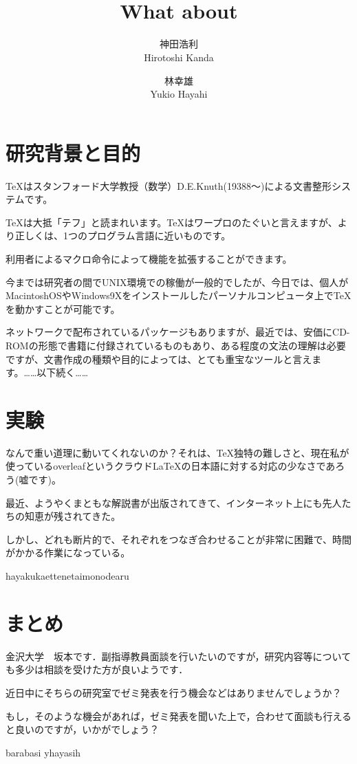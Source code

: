 \documentclass[twocolumn,a4paper]{jarticle}
\title{{\bf電子情報通信学会題目}
{\normalsize \\ What about}}
\author{
神田浩利 \\ Hirotoshi Kanda \and
林幸雄 \\ Yukio Hayahi
}
\begin{document}
\maketitle
\section{研究背景と目的}

TeXはスタンフォード大学教授（数学）D.E.Knuth(19388～)による文書整形システムです。


TeXは大抵「テフ」と読まれいます。TeXはワープロのたぐいと言えますが、より正しくは、1つのプログラム言語に近いものです。


利用者によるマクロ命令によって機能を拡張することができます。


今までは研究者の間でUNIX環境での稼働が一般的でしたが、今日では、個人がMacintoshOSやWindows9Xをインストールしたパーソナルコンピュータ上でTeXを動かすことが可能です。


ネットワークで配布されているパッケージもありますが、最近では、安価にCD-ROMの形態で書籍に付録されているものもあり、ある程度の文法の理解は必要ですが、文書作成の種類や目的によっては、とても重宝なツールと言えます。……以下続く……


\section{実験}

なんで重い道理に動いてくれないのか？それは、TeX独特の難しさと、現在私が使っているoverleafというクラウドLaTeXの日本語に対する対応の少なさであろう(嘘です)。


最近、ようやくまともな解説書が出版されてきて、インターネット上にも先人たちの知恵が残されてきた。


しかし、どれも断片的で、それぞれをつなぎ合わせることが非常に困難で、時間がかかる作業になっている。


hayakukaettenetaimonodearu


\section{まとめ}
金沢大学　坂本です．副指導教員面談を行いたいのですが，研究内容等についても多少は相談を受けた方が良いようです．


近日中にそちらの研究室でゼミ発表を行う機会などはありませんでしょうか？


もし，そのような機会があれば，ゼミ発表を聞いた上で，合わせて面談も行えると良いのですが，いかがでしょう？


\begin{thebibliography}{2}
\bibitem{} barabasi
\bibitem{} yhayasih

\end{thebibliography}
\end{document}
